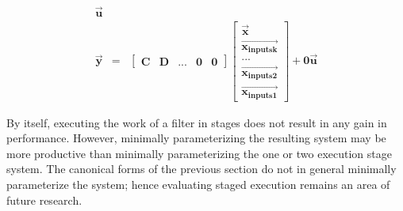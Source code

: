 \begin{eqnarray*}
\vec{\mathbf{u}} \\
\vec{\mathbf{y}} & = & \left [ \begin{array} {ccccc} \mathbf{C} &
\mathbf{D} & ... & \mathbf{0} & \mathbf{0} \end{array} \right ]
\left [ \begin{array} {c} \vec{\mathbf{x}}
\\ \vec{\mathbf{x_{inputsk}}} \\ ... \\ \vec{\mathbf{x_{inputs2}}}
\\ \vec{\mathbf{x_{inputs1}}} \end{array} \right ] + \mathbf{0} \vec{\mathbf{u}}
\end{eqnarray*}

    By itself, executing the work of a filter in stages does not
result in any gain in performance. However, minimally
parameterizing the resulting system may be more productive than
minimally parameterizing the one or two execution stage system.
The canonical forms of the previous section do not in general
minimally parameterize the system; hence evaluating staged
execution remains an area of future research.
